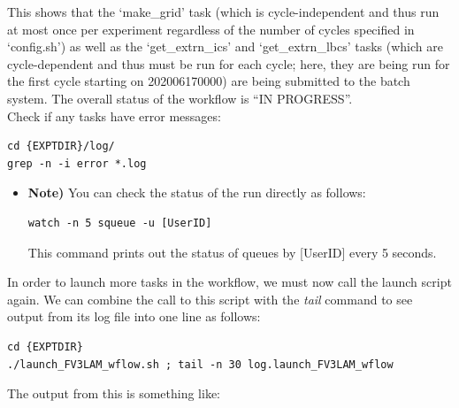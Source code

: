 \documentclass[11pt,fleqn]{report}              %
\begin{document}
This shows that the `make\_grid' task (which is cycle-independent and thus run at most once per experiment regardless of the number of cycles specified in `config.sh') as well as the `get\_extrn\_ics' and `get\_extrn\_lbcs' tasks (which are cycle-dependent and thus must be run for each cycle; here, they are being run for the first cycle starting on 202006170000) are being submitted to the batch system. The overall status of the workflow is ``IN PROGRESS''. \\

Check if any tasks have error messages:
\lstset{language=bash}   
\begin{lstlisting}[frame=trBL]
cd {EXPTDIR}/log/
grep -n -i error *.log
\end{lstlisting}

\begin{itemize}
\item {\bf Note)} You can check the status of the run directly as follows:
\lstset{language=bash}   
\begin{lstlisting}[frame=trBL]
watch -n 5 squeue -u [UserID]
\end{lstlisting}
This command prints out the status of queues by [UserID] every 5 seconds.
\end{itemize}

\vspace{0.5cm}


In order to launch more tasks in the workflow, we must now call the launch script again. We can combine the call to this script with the {\it tail} command to see output from its log file into one line as follows:

\lstset{language=bash}   
\begin{lstlisting}[frame=trBL]
cd {EXPTDIR}
./launch_FV3LAM_wflow.sh ; tail -n 30 log.launch_FV3LAM_wflow
\end{lstlisting}

The output from this is something like:
\end{document}
